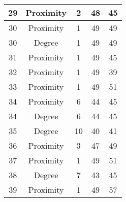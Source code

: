 \documentclass[results.tex]{subfiles}
\begin{document}
\begin{center}
\begin{tabular}{| c || c | c | c | c |}
            \hline
            29                      & Proximity                    & 2                      & 48                      & 45                   \\
            \hline
            30                      & Proximity                    & 1                      & 49                      & 49                   \\
            \hline
            30                      & Degree                       & 1                      & 49                      & 49                   \\
            \hline
            31                      & Proximity                    & 1                      & 49                      & 45                   \\
            \hline
            32                      & Proximity                    & 1                      & 49                      & 39                   \\
            \hline
            33                      & Proximity                    & 1                      & 49                      & 51                   \\
            \hline
            34                      & Proximity                    & 6                      & 44                      & 45                   \\
            \hline
            34                      & Degree                       & 6                      & 44                      & 45                   \\
            \hline
            35                      & Degree                       & 10                     & 40                      & 41                   \\
            \hline
            36                      & Proximity                    & 3                      & 47                      & 49                   \\
            \hline
            37                      & Proximity                    & 1                      & 49                      & 51                   \\
            \hline
            38                      & Degree                       & 7                      & 43                      & 45                   \\
            \hline
            39                      & Proximity                    & 1                      & 49                      & 57                   \\

\end{tabular}
\end{center}
\end{document}
